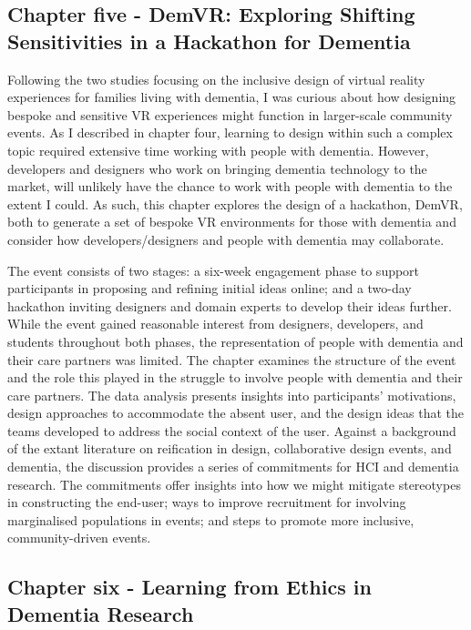 \subsection{Chapter five - DemVR: Exploring Shifting Sensitivities in a Hackathon for Dementia}
\label{Intro:ChapterFive}
Following the two studies focusing on the inclusive design of virtual reality experiences for families living with dementia, I was curious about how designing bespoke and sensitive VR experiences might function in larger-scale community events. As I described in chapter four, learning to design within such a complex topic required extensive time working with people with dementia. However, developers and designers who work on bringing dementia technology to the market, will unlikely have the chance to work with people with dementia to the extent I could. As such, this chapter explores the design of a hackathon, DemVR, both to generate a set of bespoke VR environments for those with dementia and consider how developers/designers and people with dementia may collaborate.

The event consists of two stages: a six-week engagement phase to support participants in proposing and refining initial ideas online; and a two-day hackathon inviting designers and domain experts to develop their ideas further. While the event gained reasonable interest from designers, developers, and students throughout both phases, the representation of people with dementia and their care partners was limited. The chapter examines the structure of the event and the role this played in the struggle to involve people with dementia and their care partners. The data analysis presents insights into participants’ motivations, design approaches to accommodate the absent user, and the design ideas that the teams developed to address the social context of the user. Against a background of the extant literature on reification in design, collaborative design events, and dementia, the discussion provides a series of commitments for HCI and dementia research. The commitments offer insights into how we might mitigate stereotypes in constructing the end-user; ways to improve recruitment for involving marginalised populations in events; and steps to promote more inclusive, community-driven events. 

\subsection{Chapter six - Learning from Ethics in Dementia Research}
\label{Intro:ChapterSix}

